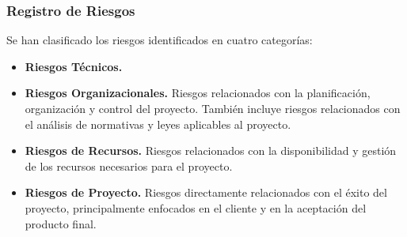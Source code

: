\subsubsection{Registro de Riesgos}
Se han clasificado los riesgos identificados en cuatro categorías:
\begin{itemize}
    \item \textbf{Riesgos Técnicos.} 
    \item \textbf{Riesgos Organizacionales.} Riesgos relacionados con la planificación, organización y control del proyecto. También incluye riesgos relacionados con el análisis de normativas y leyes aplicables al proyecto.
    \item \textbf{Riesgos de Recursos.} Riesgos relacionados con la disponibilidad y gestión de los recursos necesarios para el proyecto.
    \item \textbf{Riesgos de Proyecto.} Riesgos directamente relacionados con el éxito del proyecto, principalmente enfocados en el cliente y en la aceptación del producto final.
\end{itemize}

